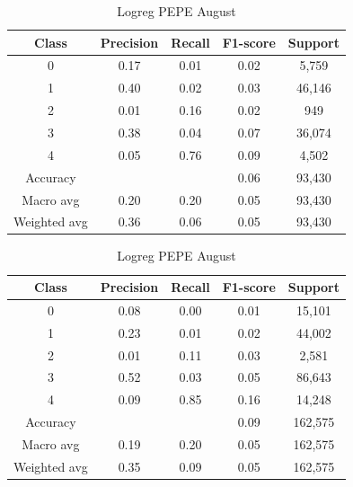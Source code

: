 \begin{enumerate}
        \begin{table}[H]
        \centering
        \scriptsize
        \begin{minipage}{0.48\textwidth}
        \centering
        \begin{tabular}{c|cccc}
        \hline
        Class & Precision & Recall & F1-score & Support \\
        \hline
        0 & 0.17 & 0.01 & 0.02 & 5,759 \\
        1 & 0.40 & 0.02 & 0.03 & 46,146 \\
        2 & 0.01 & 0.16 & 0.02 & 949 \\
        3 & 0.38 & 0.04 & 0.07 & 36,074 \\
        4 & 0.05 & 0.76 & 0.09 & 4,502 \\
        \hline
        Accuracy &       &      & 0.06 & 93,430 \\
        Macro avg & 0.20 & 0.20 & 0.05 & 93,430 \\
        Weighted avg & 0.36 & 0.06 & 0.05 & 93,430 \\
        \hline
        \end{tabular}
        \caption{Logreg DOGE August}
        \label{tab:classifier_1_report_logreg_doge_non_filtered_aug}
        \end{minipage}
        \hfill
        \begin{minipage}{0.48\textwidth}
        \centering
        \begin{tabular}{c|cccc}
        \hline
        Class & Precision & Recall & F1-score & Support \\
        \hline
        0 & 0.08 & 0.00 & 0.01 & 15,101 \\
        1 & 0.23 & 0.01 & 0.02 & 44,002 \\
        2 & 0.01 & 0.11 & 0.03 & 2,581 \\
        3 & 0.52 & 0.03 & 0.05 & 86,643 \\
        4 & 0.09 & 0.85 & 0.16 & 14,248 \\
        \hline
        Accuracy &       &      & 0.09 & 162,575 \\
        Macro avg & 0.19 & 0.20 & 0.05 & 162,575 \\
        Weighted avg & 0.35 & 0.09 & 0.05 & 162,575 \\
        \hline
        \end{tabular}
        \caption{Logreg PEPE August}
        \label{tab:classifier_1_report_logreg_pepe_non_filtered_aug}
        \end{minipage}
        

\end{table}
\end{enumerate}
